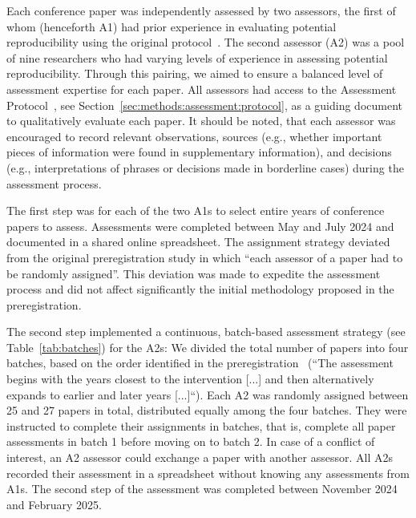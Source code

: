 \documentclass{josis}
\begin{document}
Each conference paper was independently assessed by two assessors, the first of whom (henceforth A1) had prior experience in evaluating potential reproducibility using the original protocol~\cite{nust2018, ostermann2021}.
The second assessor (A2) was a pool of nine researchers who had varying levels of experience in assessing potential reproducibility. Through this pairing, we aimed to ensure a balanced level of assessment expertise for each paper. All assessors had access to the Assessment Protocol~\cite{assessment_protocol}, see Section~\ref{sec:methods:assessment:protocol}, as a guiding document to qualitatively evaluate each paper. It should be noted, that each assessor was encouraged to record relevant observations, sources (e.g., whether important pieces of information were found in supplementary information), and decisions (e.g., interpretations of phrases or decisions made in borderline cases) during the assessment process.

The first step was for each of the two A1s to select entire years of conference papers to assess. Assessments were completed between May and July 2024 and documented in a shared online spreadsheet. The assignment strategy deviated from the original preregistration study in which ``each assessor of a paper had to be randomly assigned''. This deviation was made to expedite the assessment process and did not affect significantly the initial methodology proposed in the preregistration.

The second step implemented a continuous, batch-based assessment strategy (see Table~\ref{tab:batches}) for the A2s: We divided the total number of papers into four batches, based on the order identified in the preregistration~\cite{nust2023_prereg} (``The assessment begins with the years closest to the intervention [...] and then alternatively expands to earlier and later years [...]``). Each A2 was randomly assigned between 25 and 27 papers in total, distributed equally among the four batches. They were instructed to complete their assignments in batches, that is, complete all paper assessments in batch 1 before moving on to batch 2. In case of a conflict of interest, an A2 assessor could exchange a paper with another assessor. All A2s recorded their assessment in a spreadsheet without knowing any assessments from A1s. The second step of the assessment was completed between November 2024 and February 2025.
\end{document}
